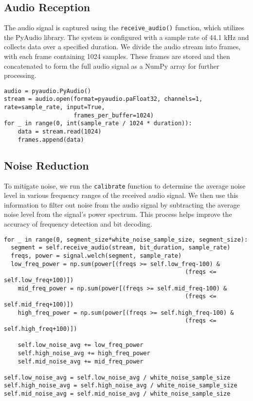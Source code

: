 \documentclass[11pt]{article}
\begin{document}
\subsection{Audio Reception}
The audio signal is captured using the \texttt{receive\_audio()} function, which utilizes the PyAudio library. The system is configured with a sample rate of 44.1 kHz and collects data over a specified duration. We divide the audio stream into frames, with each frame containing 1024 samples. These frames are stored and then concatenated to form the full audio signal as a NumPy array for further processing.
\begin{tcolorbox}[colback=black!10!white, colframe=black]
\begin{verbatim}
audio = pyaudio.PyAudio()
stream = audio.open(format=pyaudio.paFloat32, channels=1, rate=sample_rate, input=True, 
                    frames_per_buffer=1024)
for _ in range(0, int(sample_rate / 1024 * duration)): 
    data = stream.read(1024) 
    frames.append(data)
\end{verbatim}
\end{tcolorbox}
\subsection{Noise Reduction}
To mitigate noise, we run the \texttt{calibrate} function to determine the average noise level in various frequency ranges of the received audio signal. We then use this information to filter out noise from the audio signal by subtracting the average noise level from the signal's power spectrum. This process helps improve the accuracy of frequency detection and bit decoding.
\begin{tcolorbox}[colback=black!10!white, colframe=black]
\begin{verbatim}
for _ in range(0, segment_size*white_noise_sample_size, segment_size):
  segment = self.receive_audio(stream, bit_duration, sample_rate)
  freqs, power = signal.welch(segment, sample_rate)
  low_freq_power = np.sum(power[(freqs >= self.low_freq-100) & 
                                                    (freqs <= self.low_freq+100)])
    mid_freq_power = np.sum(power[(freqs >= self.mid_freq-100) & 
                                                    (freqs <= self.mid_freq+100)])
    high_freq_power = np.sum(power[(freqs >= self.high_freq-100) & 
                                                    (freqs <= self.high_freq+100)])

    self.low_noise_avg += low_freq_power
    self.high_noise_avg += high_freq_power
    self.mid_noise_avg += mid_freq_power

self.low_noise_avg = self.low_noise_avg / white_noise_sample_size
self.high_noise_avg = self.high_noise_avg / white_noise_sample_size
self.mid_noise_avg = self.mid_noise_avg / white_noise_sample_size

\end{verbatim}
\end{tcolorbox}
\end{document}
